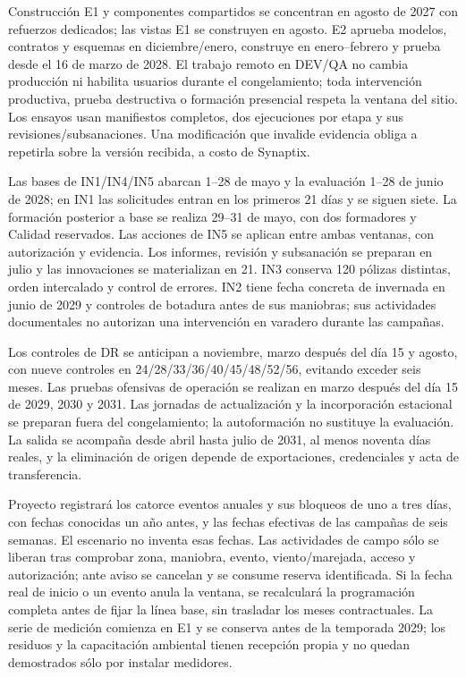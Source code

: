 Construcción E1 y componentes compartidos se concentran en agosto de 2027 con refuerzos dedicados; las vistas E1 se construyen en agosto. E2 aprueba modelos, contratos y esquemas en diciembre/enero, construye en enero--febrero y prueba desde el 16 de marzo de 2028. El trabajo remoto en DEV/QA no cambia producción ni habilita usuarios durante el congelamiento; toda intervención productiva, prueba destructiva o formación presencial respeta la ventana del sitio. Los ensayos usan manifiestos completos, dos ejecuciones por etapa y sus revisiones/subsanaciones. Una modificación que invalide evidencia obliga a repetirla sobre la versión recibida, a costo de Synaptix.

Las bases de IN1/IN4/IN5 abarcan 1--28 de mayo y la evaluación 1--28 de junio de 2028; en IN1 las solicitudes entran en los primeros 21 días y se siguen siete. La formación posterior a base se realiza 29--31 de mayo, con dos formadores y Calidad reservados. Las acciones de IN5 se aplican entre ambas ventanas, con autorización y evidencia. Los informes, revisión y subsanación se preparan en julio y las innovaciones se materializan en 21. IN3 conserva 120 pólizas distintas, orden intercalado y control de errores. IN2 tiene fecha concreta de invernada en junio de 2029 y controles de botadura antes de sus maniobras; sus actividades documentales no autorizan una intervención en varadero durante las campañas.

Los controles de DR se anticipan a noviembre, marzo después del día 15 y agosto, con nueve controles en 24/28/33/36/40/45/48/52/56, evitando exceder seis meses. Las pruebas ofensivas de operación se realizan en marzo después del día 15 de 2029, 2030 y 2031. Las jornadas de actualización y la incorporación estacional se preparan fuera del congelamiento; la autoformación no sustituye la evaluación. La salida se acompaña desde abril hasta julio de 2031, al menos noventa días reales, y la eliminación de origen depende de exportaciones, credenciales y acta de transferencia.

Proyecto registrará los catorce eventos anuales y sus bloqueos de uno a tres días, con fechas conocidas un año antes, y las fechas efectivas de las campañas de seis semanas. El escenario no inventa esas fechas. Las actividades de campo sólo se liberan tras comprobar zona, maniobra, evento, viento/marejada, acceso y autorización; ante aviso se cancelan y se consume reserva identificada. Si la fecha real de inicio o un evento anula la ventana, se recalculará la programación completa antes de fijar la línea base, sin trasladar los meses contractuales. La serie de medición comienza en E1 y se conserva antes de la temporada 2029; los residuos y la capacitación ambiental tienen recepción propia y no quedan demostrados sólo por instalar medidores.




